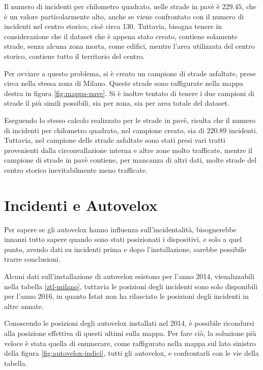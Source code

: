 \documentclass[a4paper]{report}
\begin{document}
Il numero di incidenti per chilometro quadrato, nelle strade in pavè è  $229.45$, che è un valore 
particolarmente alto, anche se viene confrontato con il numero di incidenti nel centro storico, 
cioè circa 130.
Tuttavia, bisogna tenere in considerazione che il dataset che è appena stato creato, contiene solamente 
strade, senza alcuna zona morta, come edifici, mentre l'area utilizzata del centro storico, 
contiene tutto il territorio del centro.

Per ovviare a questo problema, si è creato un campione di strade asfaltate, prese circa 
nella stessa zona di Milano. 
Queste strade sono raffigurate nella mappa destra in figura \ref{fig:mappa-pave}. 
Si è inoltre tentato di tenere i due campioni di strade il più simili possibili, sia per zona, 
sia per area totale del dataset.

Eseguendo lo stesso calcolo realizzato per le strade in pavè, risulta che il numero di incidenti per 
chilometro quadrato, nel campione creato, sia di $220.89$ incidenti.
Tuttavia, nel campione delle strade asfaltate sono stati presi vari tratti provenienti dalla 
circonvallazione interna e altre zone molto trafficate, mentre il campione di strade in pavè 
contiene, per mancanza di altri dati, molte strade del centro storico inevitabilmente 
meno trafficate.

\section{Incidenti e Autovelox}

Per sapere se gli autovelox hanno influenza sull'incidentalità, 
bisognerebbe innanzi tutto sapere quando sono stati posizionati i dispositivi, e solo a quel punto, 
avendo dati su incidenti prima e dopo l'installazione, sarebbe possibile trarre conclusioni.

Alcuni dati sull'installazione di autovelox esistono per l'anno 2014, visualizzabili nella 
tabella \ref{ztl-milano}, tuttavia le posizioni degli incidenti 
sono solo disponibili per l'anno 2016, in quanto Istat non ha rilasciato 
le posizioni degli incidenti in altre annate.

Conoscendo le posizioni degli autovelox installati nel 2014, è possibile ricondursi alla 
posizione effettiva di questi ultimi sulla mappa.
Per fare ciò, la soluzione più veloce è stata quella di enumerare, 
come raffigurato nella mappa sul lato sinistro della figura \ref{fig:autovelox-indici}, 
tutti gli autovelox, e confrontarli con le vie della tabella.
\end{document}
